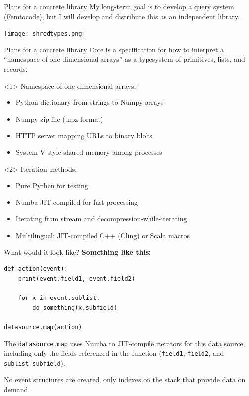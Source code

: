 \documentclass{beamer}
\begin{document}
\begin{frame}{Plans for a concrete library}
\large
\vspace{0.5 cm}
My long-term goal is to develop a query system (Femtocode), but I will develop and distribute this as an independent library.

\vspace{0.5 cm}
\texttt{[image: shredtypes.png]}
\end{frame}

\begin{frame}{Plans for a concrete library}
\vspace{0.5 cm}
\large
Core is a specification for how to interpret a ``namespace of one-dimensional arrays'' as a typesystem of primitives, lists, and records.

\vspace{0.5 cm}
\begin{onlyenv}<1>
Namespace of one-dimensional arrays:
\begin{itemize}
\item Python dictionary from strings to Numpy arrays
\item Numpy zip file (.npz format)
\item HTTP server mapping URLs to binary blobs
\item System V style shared memory among processes
\end{itemize}
\end{onlyenv}
\begin{onlyenv}<2>
Iteration methods:
\begin{itemize}
\item Pure Python for testing
\item Numba JIT-compiled for fast processing
\item Iterating from stream and decompression-while-iterating
\item Multilingual: JIT-compiled C++ (Cling) or Scala macros
\end{itemize}
\end{onlyenv}
\end{frame}

\begin{frame}[fragile]{What would it look like?}
\vspace{0.3 cm}
{\bf Something like this:}

\small
\begin{verbatim}
def action(event):
    print(event.field1, event.field2)

    for x in event.sublist:
        do_something(x.subfield)

datasource.map(action)
\end{verbatim}

\normalsize
The {\tt\small datasource.map} uses Numba to JIT-compile iterators for this data source, including only the fields referenced in the function ({\tt\small field1}, {\tt\small field2}, and {\tt\small sublist-subfield}).

\vspace{0.25 cm}
No event structures are created, only indexes on the stack that provide data on demand.
\end{frame}
\end{document}
